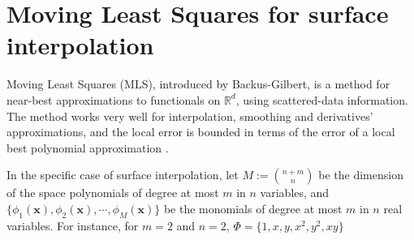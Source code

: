 \section{Moving Least Squares for surface interpolation}
Moving Least Squares (MLS), introduced by Backus-Gilbert, is a method for
near-best approximations to functionals on $\mathbb{R}^d$, using scattered-data
information. The method works very well for interpolation, smoothing and
derivatives' approximations, and the local error is bounded in terms of the
error of a local best polynomial approximation \cite{levin1998approximation}.

In the specific case of surface interpolation, let $M := {n+m \choose n}$ be the
dimension of the space polynomials of degree at most $m$ in $n$ variables, and
$\{\phi_1(\textbf{x}),\phi_2(\textbf{x}),\cdots, \phi_M(\textbf{x})\}$ be the
monomials of degree at most $m$ in $n$ real variables. For instance, for
$m=2$ and $n=2$, $\Phi=\{1,x,y,x^2,y^2,xy\}$
